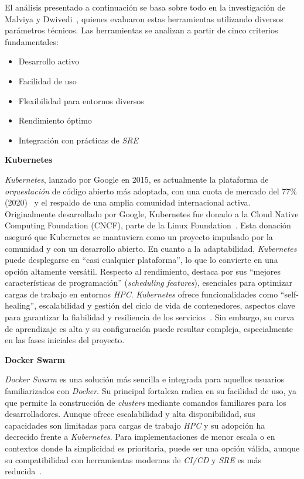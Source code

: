 El análisis presentado a continuación se basa sobre todo en la investigación de Malviya y Dwivedi~\cite{ref9}, quienes evaluaron estas herramientas utilizando diversos parámetros técnicos. Las herramientas se analizan a partir de cinco criterios fundamentales:
\begin{itemize}
    \item Desarrollo activo
    \item Facilidad de uso
    \item Flexibilidad para entornos diversos
    \item Rendimiento óptimo
    \item Integración con prácticas de \textit{SRE}
\end{itemize}

\newpage
\noindent\textbf{Kubernetes}

\textit{Kubernetes}, lanzado por Google en 2015, es actualmente la plataforma de \textit{orquestación} de código abierto más adoptada, con una cuota de mercado del 77\% (2020)~\cite{ref7} y el respaldo de una amplia comunidad internacional activa. Originalmente desarrollado por Google, Kubernetes fue donado a la Cloud Native Computing Foundation (CNCF), parte de la Linux Foundation~\cite{ref37}. Esta donación aseguró que Kubernetes se mantuviera como un proyecto impulsado por la comunidad y con un desarrollo abierto.  En cuanto a la adaptabilidad, \textit{Kubernetes} puede desplegarse en ``casi cualquier plataforma'', lo que lo convierte en una opción altamente versátil. Respecto al rendimiento, destaca por sus ``mejores características de programación'' (\textit{scheduling features}), esenciales para optimizar cargas de trabajo en entornos \textit{HPC}. \textit{Kubernetes} ofrece funcionalidades como ``self-healing'', escalabilidad y gestión del ciclo de vida de contenedores, aspectos clave para garantizar la fiabilidad y resiliencia de los servicios~\cite{ref8}. Sin embargo, su curva de aprendizaje es alta y su configuración puede resultar compleja, especialmente en las fases iniciales del proyecto.

\vspace{0.5cm}
\noindent\textbf{Docker Swarm}

\textit{Docker Swarm} es una solución más sencilla e integrada para aquellos usuarios familiarizados con \textit{Docker}. Su principal fortaleza radica en su facilidad de uso, ya que permite la construcción de \textit{clusters} mediante comandos familiares para los desarrolladores. Aunque ofrece escalabilidad y alta disponibilidad, sus capacidades son limitadas para cargas de trabajo \textit{HPC} y su adopción ha decrecido frente a \textit{Kubernetes}. Para implementaciones de menor escala o en contextos donde la simplicidad es prioritaria, puede ser una opción válida, aunque su compatibilidad con herramientas modernas de \textit{CI/CD} y \textit{SRE} es más reducida~\cite{ref9,ref10}.

